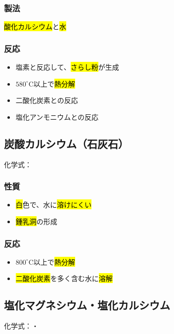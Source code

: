  \subsubsection{製法}
 \hl{酸化カルシウム}と\hl{水} \K\\
 \subsubsection{反応}
 \begin{itemize}
  \item 塩素と反応して、\hl{さらし粉}が生成\\
  \item $580^{\circ}$C以上で\hl{熱分解}\\
  \item 二酸化炭素との反応\\
  \item 塩化アンモニウムとの反応\\
 \end{itemize}
 \subsection{炭酸カルシウム（石灰石）}
 化学式：\hl{}
 \subsubsection{性質}
 \begin{itemize}
  \item \hl{白}色で、水に\hl{溶けにくい}
  \item \hl{鍾乳洞}の形成
 \end{itemize}
 \subsubsection{反応}
 \begin{itemize}
  \item $800^{\circ}$C以上で\hl{熱分解}\\
  \item \hl{二酸化炭素}を多く含む水に\hl{溶解}\\
 \end{itemize}
 \subsection{塩化マグネシウム・塩化カルシウム}
 化学式：\hl{}・\hl{}
